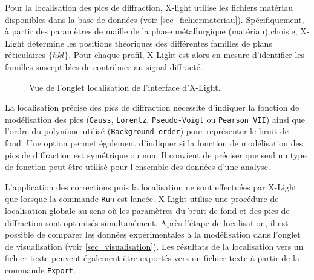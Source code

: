 \documentclass[french,a4paper]{report}
\begin{document}
Pour la localisation des pics de diffraction, X-light utilise les fichiers matériau disponibles dans la base de données (voir \ref{sec_fichiermateriau}). Spécifiquement, à partir des paramètres de maille de la phase métallurgique (matériau) choisie, X-Light détermine les positions théoriques des différentes familles de plans réticulaires $\{hkl\}$. Pour chaque profil, X-Light est alors en mesure d'identifier les familles susceptibles de contribuer au signal diffracté.


\begin{figure}[bh!]
\centering
{}
\caption{Vue de l'onglet localisation de l'interface d'X-Light.}
\label{fig_localize}
\end{figure}

La localisation précise des pics de diffraction nécessite d'indiquer la fonction de modélisation des pics (\texttt{Gauss}, \texttt{Lorentz}, \texttt{Pseudo-Voigt} ou \texttt{Pearson VII}) ainsi que l'ordre du polynôme utilisé (\texttt{Background order}) pour représenter le bruit de fond. Une option permet également d'indiquer si la fonction de modélisation des pics de diffraction est symétrique ou non. Il convient de préciser que seul un type de fonction peut être utilisé pour l'ensemble des données d'une analyse.

L'application des corrections puis la localisation ne sont effectuées par X-Light que lorsque la commande \texttt{Run} est lancée. X-Light utilise une procédure de localisation globale au sens où les paramètres du bruit de fond et des pics de diffraction sont optimisés simultanément. Après l'étape de localisation, il est possible de comparer les données expérimentales à la modélisation dans l'onglet de visualisation (voir \ref{sec_visualisation}). Les résultats de la localisation vers un fichier texte peuvent également être exportés vers un fichier texte à partir de la commande \texttt{Export}.
\end{document}
